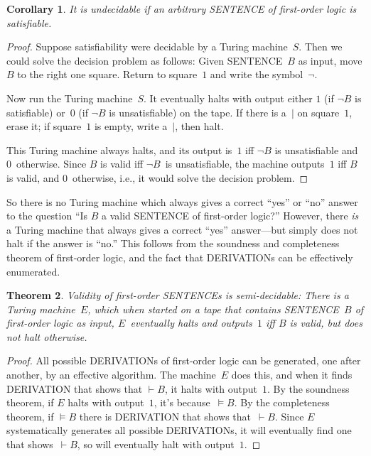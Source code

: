\documentclass[10pt,a4paper]{article}
\newcommand*{\olup}[1]{\MakeUppercase{#1}}
\theoremstyle{plain}
\newtheorem{thm}{Theorem}[section]
\newtheorem{cor}[thm]{Corollary}
\theoremstyle{definition}
\theoremstyle{remark}
\newenvironment{explain}{}{}
\newcommand*{\ollabel}[1]{\label{#1}}
\providecommand{\Proves}{\mathrel{\vdash}}
\providecommand{\Entails}{\mathrel{\models}}
\providecommand{\TMstroke}{\mid}
\begin{document}
\begin{cor}\ollabel{cor:undecidable-sat}%
It is undecidable if an arbitrary \olup{sentence} of first-order logic is satisfiable.
\end{cor}

\begin{proof}
  Suppose satisfiability were decidable by a Turing machine~$S$. Then
  we could solve the decision problem as follows: Given
  \olup{sentence}~$B$ as input, move $B$ to the right one square.
  Return to square~$1$ and write the symbol~$\lnot$.

  Now run the Turing machine~$S$. It eventually halts with output
  either $1$ (if $\lnot B$ is satisfiable) or~$0$ (if $\lnot B$ is
  unsatisfiable) on the tape. If there is a~$\TMstroke$ on square~$1$,
  erase it; if square~$1$ is empty, write a~$\TMstroke$, then halt.

  This Turing machine always halts, and its output is~$1$ iff $\lnot
  B$ is unsatisfiable and $0$~otherwise. Since $B$ is valid iff
  $\lnot B$~is unsatisfiable, the machine outputs~$1$ iff $B$ is
  valid, and $0$~otherwise, i.e., it would solve the decision problem.
\end{proof}

\begin{explain}
So there is no Turing machine which always gives a
correct ``yes'' or ``no'' answer to the question ``Is $B$ a valid
\olup{sentence} of first-order logic?'' However, there \emph{is} a Turing
machine that always gives a correct ``yes'' answer---but simply does
not halt if the answer is ``no.'' This follows from the soundness and
completeness theorem of first-order logic, and the fact that
\olup{derivation}s can be effectively enumerated.
\end{explain}

\begin{thm}
  \ollabel{thm:valid-ce}%
  Validity of first-order \olup{sentence}s is semi-decidable: There is a
  Turing machine~$E$, which when started on a tape that contains
  \olup{sentence}~$B$ of first-order logic as input, $E$~eventually
  halts and outputs~$1$ iff $B$ is valid, but does not halt
  otherwise.
\end{thm}

\begin{proof}
  All possible \olup{derivation}s of first-order logic can be generated,
  one after another, by an effective algorithm.  The machine~$E$ does
  this, and when it finds \olup{derivation} that shows that $\Proves
  B$, it halts with output~$1$. By the soundness theorem, if $E$
  halts with output~$1$, it's because~$\Entails B$. By the
  completeness theorem, if $\Entails B$ there is \olup{derivation} that
  shows that~$\Proves B$. Since $E$ systematically generates all
  possible \olup{derivation}s, it will eventually find one that
  shows~$\Proves B$, so will eventually halt with output~$1$.
\end{proof}
\end{document}
